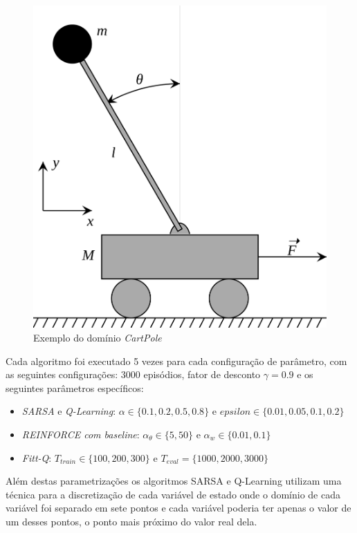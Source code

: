 \documentclass[letterpaper]{article}
\begin{document}
\begin{figure}[t]
  \centering
  \includegraphics[width=0.9\columnwidth]{cart-pole}
  \caption{Exemplo do domínio \textit{CartPole}}
  \label{fig:cart-pole}
\end{figure}

Cada algoritmo foi executado 5 vezes para cada configuração de parâmetro, com as seguintes configurações: 3000 episódios, fator de desconto $\gamma = 0.9$ e os seguintes parâmetros específicos:

\begin{itemize}
  \item \textit{SARSA} e \textit{Q-Learning}: $\alpha \in \{ 0.1, 0.2, 0.5, 0.8 \}$ e $epsilon \in \{ 0.01, 0.05, 0.1, 0.2 \}$
  \item \textit{REINFORCE com baseline}: $\alpha_{\theta} \in \{ 5, 50 \}$ e $\alpha_{w} \in \{ 0.01, 0.1 \}$
  \item \textit{Fitt-Q}: $T_{train} \in \{ 100, 200, 300 \} $ e $T_{eval} = \{ 1000, 2000, 3000 \}$
\end{itemize}

Além destas parametrizações os algoritmos SARSA e Q-Learning utilizam uma técnica para a discretização de cada variável de estado onde o domínio de cada variável foi separado em sete pontos e cada variável poderia ter apenas o valor de um desses pontos, o ponto mais próximo do valor real dela. 
\end{document}
